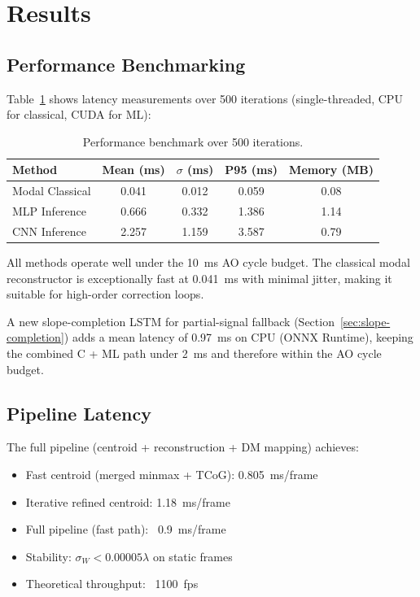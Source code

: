 \documentclass[twocolumn,10pt]{IEEEtran}
\begin{document}
\section{Results}
\label{sec:results}

\subsection{Performance Benchmarking}
\label{sec:perf}

Table~\ref{tab:perf} shows latency measurements over 500 iterations (single-threaded, CPU for classical, CUDA for ML):

\begin{table}[H]
\centering
\caption{Performance benchmark over 500 iterations.}
\label{tab:perf}
\small
\begin{tabular}{lcccc}
\toprule
Method & Mean (ms) & $\sigma$ (ms) & P95 (ms) & Memory (MB) \\
\midrule
Modal Classical & 0.041 & 0.012 & 0.059 & 0.08 \\
MLP Inference & 0.666 & 0.332 & 1.386 & 1.14 \\
CNN Inference & 2.257 & 1.159 & 3.587 & 0.79 \\
\bottomrule
\end{tabular}
\end{table}

All methods operate well under the 10~ms AO cycle budget. The classical modal reconstructor is exceptionally fast at 0.041~ms with minimal jitter, making it suitable for high-order correction loops.

A new slope-completion LSTM for partial-signal fallback (Section~\ref{sec:slope-completion}) adds a mean latency of 0.97~ms on CPU (ONNX Runtime), keeping the combined C + ML path under 2~ms and therefore within the AO cycle budget.

\subsection{Pipeline Latency}
\label{sec:pipeline-lat}

The full pipeline (centroid + reconstruction + DM mapping) achieves:
\begin{itemize}
\item Fast centroid (merged minmax + TCoG): 0.805~ms/frame
\item Iterative refined centroid: 1.18~ms/frame
\item Full pipeline (fast path): ~0.9~ms/frame
\item Stability: $\sigma_W < 0.00005\lambda$ on static frames
\item Theoretical throughput: ~1100~fps
\end{itemize}
\end{document}
